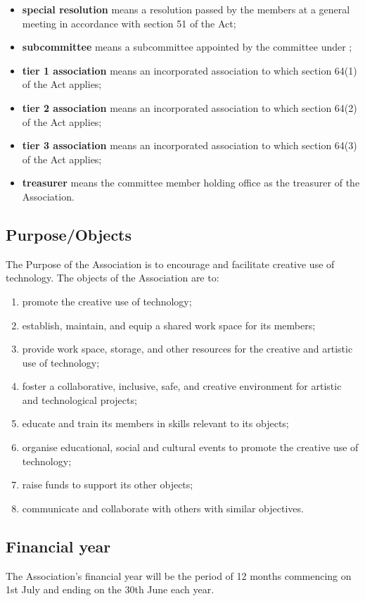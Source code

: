 \documentclass[../constitution.tex]{subfiles}
\begin{document}
\begin{itemize}[label={-}]
\item \textbf{special resolution} means a resolution passed by the members at a general meeting in accordance with section 51 of the Act;
\item \textbf{subcommittee} means a subcommittee appointed by the committee under ;
\item \textbf{tier 1 association} means an incorporated association to which section 64(1) of the Act applies;
\item \textbf{tier 2 association} means an incorporated association to which section 64(2) of the Act applies;
\item \textbf{tier 3 association} means an incorporated association to which section 64(3) of the Act applies;
\item \textbf{treasurer} means the committee member holding office as the treasurer of the Association.
\end{itemize}


\subsection{Purpose/Objects}\label{purposeobjects}

The Purpose of the Association is to encourage and facilitate creative use of technology. The objects of the Association are to:

\begin{enumerate}

\item promote the creative use of technology;
\item establish, maintain, and equip a shared work space for its members;
\item provide work space, storage, and other resources for the creative and artistic use of technology;
\item foster a collaborative, inclusive, safe, and creative environment for artistic and technological projects;
\item educate and train its members in skills relevant to its objects;
\item organise educational, social and cultural events to promote the creative use of technology;
\item raise funds to support its other objects;
\item communicate and collaborate with others with similar objectives.
\end{enumerate}


\subsection{Financial year} \label{financial-year}

The Association's financial year will be the period of 12 months commencing on 1st July and ending on the 30th June each year.
\end{document}
